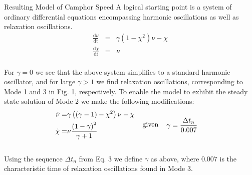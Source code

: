 \documentclass[
    a0paper, %
    portrait, %
    fontscale=0.28 %
    ]{baposter}
\newcommand{\beq}{\begin{equation}}
\newcommand{\eeq}{\end{equation}}
\newcommand{\of}[1]{\left(#1\right)}
\begin{document}
\begin{poster}
\begin{posterbox}[name=van_der_pol,column=2,span=2, below=data2, bottomaligned=camphor]{Resulting Model of Camphor Speed}
A logical starting point is a system of ordinary differential equations encompassing harmonic oscillations as well as relaxation oscillations.
\vspace{-1mm}
\beq
\begin{aligned}
&  \frac{\mathrm{d}\nu}{\mathrm{d}\mathrm{t}} &=& \gamma\of{1-\chi^2}\nu-\chi&\\
&  \frac{\mathrm{d}\chi}{\mathrm{d}\mathrm{t}} &=& \nu&
\end{aligned}
\eeq\\[-3mm]
For $\gamma=0$ we see that the above system simplifies to a standard harmonic oscillator, and for large $\gamma>1$ we find relaxation oscillations, corresponding to Mode 1 and 3 in Fig. 1, respectively. To enable the model to exhibit the steady state solution of Mode 2 we make the following modifications:
\vspace{-2mm}
\begin{equation}
\begin{aligned}
\dot{\nu} = & \gamma\of{\of{\gamma-1}-\chi^2}\nu - \chi \\
\dot{\chi} = & \nu\frac{\of{1-\gamma}^2}{\gamma +1}
\end{aligned} 
\hspace{4mm}\hbox{given}\hspace{4mm}
\begin{aligned}
&\gamma = \frac{\Delta t_n}{0.007}&
\end{aligned}
\label{mine}
\end{equation}\\[-2mm]
Using the sequence $\Delta t_n$ from Eq. 3 we define $\gamma$ as above, where 0.007 is the characteristic time of relaxation oscillations found in Mode 3. 
\end{posterbox}




\end{poster}
\end{document}
